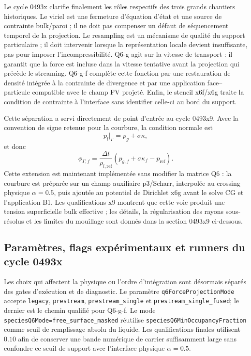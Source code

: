 \documentclass[11pt,a4paper]{article}
\begin{document}
Le cycle 0493x clarifie finalement les rôles respectifs des trois grands chantiers historiques. Le viriel est une fermeture d'équation d'état et une source de contrainte bulk/paroi ; il ne doit pas compenser un défaut de séquencement temporel de la projection. Le resampling est un mécanisme de qualité du support particulaire ; il doit intervenir lorsque la représentation locale devient insuffisante, pas pour imposer l'incompressibilité. Q6-g agit sur la vitesse de transport : il garantit que la force est incluse dans la vitesse tentative avant la projection qui précède le streaming. Q6-g-f complète cette fonction par une restauration de densité intégrée à la contrainte de divergence et par une application face--particule compatible avec le champ FV projeté. Enfin, le stencil x6f/x6g traite la condition de contrainte à l'interface sans identifier celle-ci au bord du support.

Cette séparation a servi directement de point d'entrée au cycle 0493x9. Avec la convention de signe retenue pour la courbure, la condition normale est
\begin{equation}
  p_l|_\Gamma=p_g+\sigma\kappa,
\end{equation}
et donc
\begin{equation}
  \phi_{\Gamma,f}=
  \frac{\Delta t}{\rho_{l,\mathrm{ref}}}
  \left(p_{g,f}+\sigma\kappa_f-p_{\mathrm{ref}}\right).
\end{equation}
Cette extension est maintenant implémentée sans modifier la matrice Q6 : la courbure est préparée sur un champ auxiliaire p3/Scharr, interpolée au crossing physique $\alpha=0.5$, puis ajoutée au potentiel de Dirichlet x6g avant le solve CG et l'application B1. Les qualifications x9 montrent que cette voie produit une tension superficielle bulk effective ; les détails, la régularisation des rayons sous-résolus et les limites du mouillage sont donnés dans la section 0493x9 ci-dessous.


\subsection{Paramètres, flags expérimentaux et runners du cycle 0493x}

Les choix qui affectent la physique ou l'ordre d'intégration sont désormais séparés des gates d'exécution et de diagnostic. Le paramètre \texttt{q6ForceProjectionMode} accepte \texttt{legacy}, \texttt{prestream}, \texttt{prestream\_single} et \texttt{prestream\_single\_fused}; le dernier est le chemin qualifié pour Q6-g-f. Le mode \texttt{speciesQ6Mode=free\_surface\_masked} réutilise \texttt{speciesQ6MinOccupancyFraction} comme seuil de remplissage absolu du liquide. Les qualifications finales utilisent $0.10$ afin de conserver une bande numérique de carrier suffisamment large sans confondre ce seuil de support avec l'interface physique $\alpha=0.5$.
\end{document}
